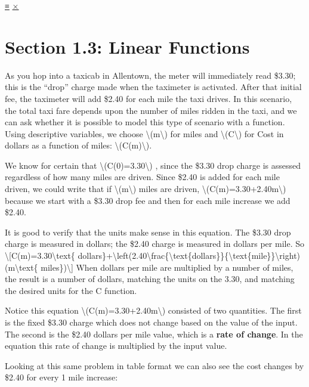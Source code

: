 \protect\hyperlink{main-nav}{≡} \protect\hyperlink{close-nav}{×}

\hypertarget{section-1.3-linear-functions}{%
\section{Section 1.3: Linear
Functions}\label{section-1.3-linear-functions}}

As you hop into a taxicab in Allentown, the meter will immediately read
\$3.30; this is the ``drop'' charge made when the taximeter is
activated. After that initial fee, the taximeter will add \$2.40 for
each mile the taxi drives. In this scenario, the total taxi fare depends
upon the number of miles ridden in the taxi, and we can ask whether it
is possible to model this type of scenario with a function. Using
descriptive variables, we choose \textbackslash{}(m\textbackslash{}) for
miles and \textbackslash{}(C\textbackslash{}) for Cost in dollars as a
function of miles: \textbackslash{}(C(m)\textbackslash{}).

We know for certain that \textbackslash{}(C(0)=3.30\textbackslash{}) ,
since the \$3.30 drop charge is assessed regardless of how many miles
are driven. Since \$2.40 is added for each mile driven, we could write
that if \textbackslash{}(m\textbackslash{}) miles are driven,
\textbackslash{}(C(m)=3.30+2.40m\textbackslash{}) because we start with
a \$3.30 drop fee and then for each mile increase we add \$2.40.

It is good to verify that the units make sense in this equation. The
\$3.30 drop charge is measured in dollars; the \$2.40 charge is measured
in dollars per mile. So
\textbackslash{}{[}C(m)=3.30\textbackslash{}text\{
dollars\}+\textbackslash{}left(2.40\textbackslash{}frac\{\textbackslash{}text\{dollars\}\}\{\textbackslash{}text\{mile\}\}\textbackslash{}right)
(m\textbackslash{}text\{ miles\})\textbackslash{}{]} When dollars per
mile are multiplied by a number of miles, the result is a number of
dollars, matching the units on the 3.30, and matching the desired units
for the C function.

Notice this equation \textbackslash{}(C(m)=3.30+2.40m\textbackslash{})
consisted of two quantities. The first is the fixed \$3.30 charge which
does not change based on the value of the input. The second is the
\$2.40 dollars per mile value, which is a \textbf{rate of change}. In
the equation this rate of change is multiplied by the input value.

Looking at this same problem in table format we can also see the cost
changes by \$2.40 for every 1 mile increase:

